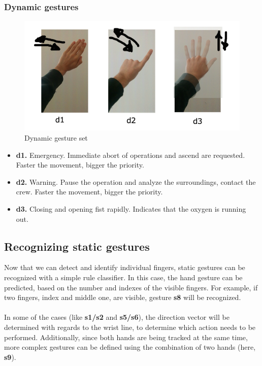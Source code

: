 \documentclass[a4paper,11pt,oneside]{article}
\begin{document}
    \subsubsection{Dynamic gestures}
    
  \begin{figure}[H]
  \centering
  \includegraphics[scale=0.5]{dynamic-gestureset.png}
  \caption{Dynamic gesture set}
  \end{figure}
  
  \begin{itemize}
    \item \textbf{d1.} Emergency. Immediate abort of operations and ascend are requested. Faster the movement, bigger the priority.
    \item \textbf{d2.} Warning. Pause the operation and analyze the surroundings, contact the crew. Faster the movement, bigger the priority.
    \item \textbf{d3.} Closing and opening fist rapidly. Indicates that the oxygen is running out.
    \end{itemize}

  \subsection{Recognizing static gestures}
  
 Now that we can detect and identify individual fingers, static gestures can be recognized with a simple rule classifier. In this case, the hand gesture can be predicted, based on the number and indexes of the visible fingers. For example, if two fingers, index and middle one, are visible, gesture \textbf{s8} will be recognized.\\
 \\
 In some of the cases (like \textbf{s1/s2} and \textbf{s5/s6}), the direction vector will be determined with regards to the wrist line, to determine which action needs to be performed. Additionally, since both hands are being tracked at the same time, more complex gestures can be defined using the combination of two hands (here, \textbf{s9}).
  
\end{document}
